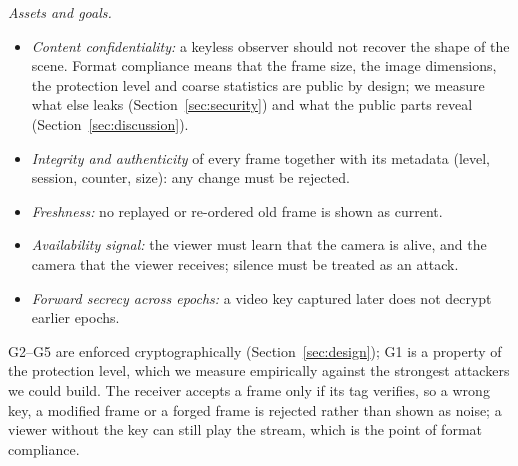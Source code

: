 \textit{Assets and goals.}
\begin{itemize}
\item[G1] \emph{Content confidentiality:} a keyless observer should not recover the shape of the scene. Format compliance means that the frame size, the image dimensions, the protection level and coarse statistics are public by design; we measure what else leaks (Section~\ref{sec:security}) and what the public parts reveal (Section~\ref{sec:discussion}).
\item[G2] \emph{Integrity and authenticity} of every frame together with its metadata (level, session, counter, size): any change must be rejected.
\item[G3] \emph{Freshness:} no replayed or re-ordered old frame is shown as current.
\item[G4] \emph{Availability signal:} the viewer must learn that the camera is alive, and the camera that the viewer receives; silence must be treated as an attack.
\item[G5] \emph{Forward secrecy across epochs:} a video key captured later does not decrypt earlier epochs.
\end{itemize}
G2--G5 are enforced cryptographically (Section~\ref{sec:design}); G1 is a property of the protection level, which we measure empirically against the strongest attackers we could build. The receiver accepts a frame only if its tag verifies, so a wrong key, a modified frame or a forged frame is rejected rather than shown as noise; a viewer without the key can still play the stream, which is the point of format compliance.
